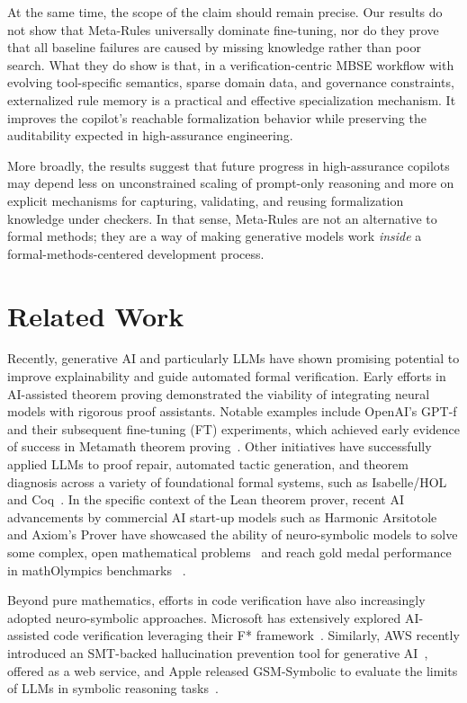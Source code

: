 \documentclass[conference]{IEEEtran}
\begin{document}
At the same time, the scope of the claim should remain precise. Our results do not show that Meta-Rules universally dominate fine-tuning, nor do they prove that all baseline failures are caused by missing knowledge rather than poor search. What they do show is that, in a verification-centric MBSE workflow with evolving tool-specific semantics, sparse domain data, and governance constraints, externalized rule memory is a practical and effective specialization mechanism. It improves the copilot's reachable formalization behavior while preserving the auditability expected in high-assurance engineering.

More broadly, the results suggest that future progress in high-assurance copilots may depend less on unconstrained scaling of prompt-only reasoning and more on explicit mechanisms for capturing, validating, and reusing formalization knowledge under checkers. In that sense, Meta-Rules are not an alternative to formal methods; they are a way of making generative models work \emph{inside} a formal-methods-centered development process.


\section{Related Work}
\label{sec:related-work}

Recently, generative AI and particularly LLMs have shown promising potential to improve explainability and guide automated formal verification. Early efforts in AI-assisted theorem proving demonstrated the viability of integrating neural models with rigorous proof assistants. Notable examples include OpenAI's GPT-f and their subsequent fine-tuning (FT) experiments, which achieved early evidence of success in Metamath theorem proving~\cite{polu2020generative}. Other initiatives have successfully applied LLMs to proof repair, automated tactic generation, and theorem diagnosis across a variety of foundational formal systems, such as Isabelle/HOL~\cite{first2023baldur} and Coq~\cite{CoqDog}. In the specific context of the Lean theorem prover, recent AI advancements by commercial AI start-up models such as Harmonic Arsitotole and Axiom's Prover have showcased the ability of neuro-symbolic models to solve some complex, open mathematical problems~\cite{axiom_territory} and reach gold medal performance in mathOlympics benchmarks ~\cite{aristotle_arXiv2510}.

Beyond pure mathematics, efforts in code verification have also increasingly adopted neuro-symbolic approaches. Microsoft has extensively explored AI-assisted code verification leveraging their F* framework~\cite{DBLP:conf/popl/SwamyHKRDFBFSKZ16}. Similarly, AWS recently introduced an SMT-backed hallucination prevention tool for generative AI~\cite{aws_bedrock_ar}, offered as a web service, and Apple released GSM-Symbolic to evaluate the limits of LLMs in symbolic reasoning tasks~\cite{mirzadeh2025gsmsymbolic}.
\end{document}

